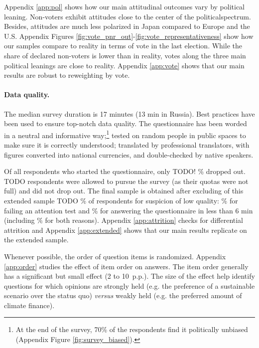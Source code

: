 \documentclass[12pt,english]{article}
\begin{document}
\begin{bibunit}
Appendix \ref{app:pol} shows how our main attitudinal outcomes vary by political leaning. Non-voters exhibit attitudes close to the center of the politicalspectrum. Besides, attitudes are much less polarized in Japan compared to Europe and the U.S. %
Appendix Figures \ref{fig:vote_pnr_out}-\ref{fig:vote_representativeness} show how our %
samples compare to reality in terms of vote in the last election. While the share of declared non-voters is lower than in reality, votes along the three main political leanings are close to reality. Appendix \ref{app:vote} shows that our main results are robust to reweighting by vote. 

\paragraph{Data quality.} 
The median survey duration is 17 minutes (13 min in Russia). %
Best practices have been used to ensure top-notch data quality. 
The questionnaire has been worded in a neutral and informative way;\footnote{At the end of the survey, 70\% of the respondents find it politically unbiased (Appendix Figure \ref{fig:survey_biased}).} tested on random people in public spaces to make sure it is correctly understood; translated by professional translators, with figures converted into national currencies, and double-checked by native speakers.

Of all respondents who started the questionnaire, only TODO! \% dropped out. TODO respondents were allowed to pursue the survey (as their quotas were not full) and did not drop out.  The final sample is obtained after excluding of this extended sample TODO \% of respondents for suspicion of low quality: \% for failing an attention test and \% for answering the questionnaire in less than 6 min (including \% for both reasons). Appendix \ref{app:attrition} checks for differential attrition and Appendix \ref{app:extended} shows that our main results replicate on the extended sample. 

Whenever possible, the order of question items is randomized. Appendix \ref{app:order} studies the effect of item order on answers. The item order generally has a significant but small effect (2 to 10~p.p.). The size of the effect help identify questions for which opinions are strongly held (e.g. the preference of a sustainable scenario over the status quo) \textit{versus} weakly held (e.g. the preferred amount of climate finance). %


\end{bibunit}
\end{document}
